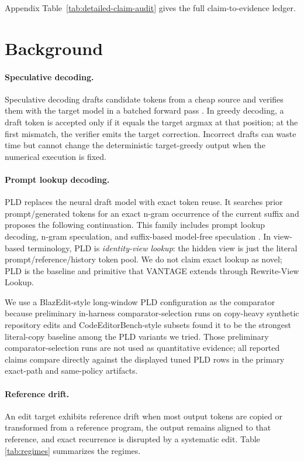 \documentclass[11pt,a4paper]{article}
\begin{document}
Appendix Table~\ref{tab:detailed-claim-audit} gives the full
claim-to-evidence ledger.

\section{Background}

\paragraph{Speculative decoding.}
Speculative decoding drafts candidate tokens from a cheap source and
verifies them with the target model in a batched forward pass
\cite{leviathan2023,chen2023}. In greedy decoding, a draft token is
accepted only if it equals the target argmax at that position; at the
first mismatch, the verifier emits the target correction. Incorrect
drafts can waste time but cannot change the deterministic target-greedy
output when the numerical execution is fixed.

\paragraph{Prompt lookup decoding.}
PLD replaces the neural draft model with exact token reuse. It searches
prior prompt/generated tokens for an exact n-gram occurrence of the
current suffix and proposes the following continuation. This family
includes prompt lookup decoding, n-gram speculation, and suffix-based
model-free speculation \cite{promptlookup,hfpld,vllmngram,tensorrtngram,suffixdecoding}.
In view-based terminology, PLD is \emph{identity-view lookup}: the hidden view
is just the literal prompt/reference/history token pool. We do not claim exact
lookup as novel; PLD is the baseline and primitive that VANTAGE extends through
Rewrite-View Lookup.

We use a BlazEdit-style long-window PLD configuration as the comparator because
preliminary in-harness comparator-selection runs on copy-heavy synthetic
repository edits and CodeEditorBench-style subsets \cite{codeeditorbench} found
it to be the strongest literal-copy baseline among the PLD variants we tried. Those preliminary
comparator-selection runs are not used as quantitative evidence; all reported
claims compare directly against the displayed tuned PLD rows in the primary
exact-path and same-policy artifacts.

\paragraph{Reference drift.}
An edit target exhibits reference drift when most output tokens are
copied or transformed from a reference program, the output remains
aligned to that reference, and exact recurrence is disrupted by a
systematic edit. Table \ref{tab:regimes} summarizes the regimes.
\end{document}
